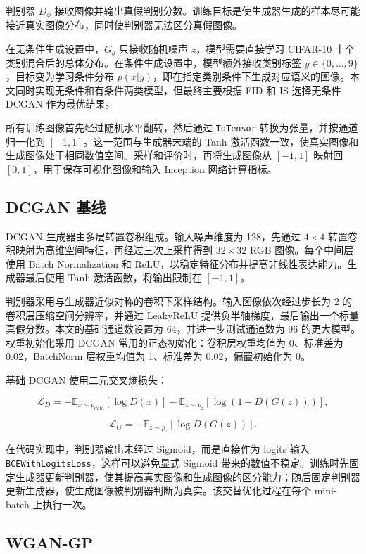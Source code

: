\documentclass[UTF8,a4paper,12pt]{ctexart}
\begin{document}
判别器 $D_\phi$ 接收图像并输出真假判别分数。训练目标是使生成器生成的样本尽可能接近真实图像分布，同时使判别器无法区分真假图像。


在无条件生成设置中，$G_\theta$ 只接收随机噪声 $z$，模型需要直接学习 CIFAR-10 十个类别混合后的总体分布。在条件生成设置中，模型额外接收类别标签 $y \in \{0,\dots,9\}$，目标变为学习条件分布 $p(x|y)$，即在指定类别条件下生成对应语义的图像。本文同时实现无条件和有条件两类模型，但最终主要根据 FID 和 IS 选择无条件 DCGAN 作为最优结果。


所有训练图像首先经过随机水平翻转，然后通过 \texttt{ToTensor} 转换为张量，并按通道归一化到 $[-1,1]$。这一范围与生成器末端的 Tanh 激活函数一致，使真实图像和生成图像处于相同数值空间。采样和评价时，再将生成图像从 $[-1,1]$ 映射回 $[0,1]$，用于保存可视化图像和输入 Inception 网络计算指标。


\subsection{DCGAN 基线}

DCGAN 生成器由多层转置卷积组成。输入噪声维度为 128，先通过 $4\times4$ 转置卷积映射为高维空间特征，再经过三次上采样得到 $32\times32$ RGB 图像。每个中间层使用 Batch Normalization 和 ReLU，以稳定特征分布并提高非线性表达能力。生成器最后使用 Tanh 激活函数，将输出限制在 $[-1, 1]$。


判别器采用与生成器近似对称的卷积下采样结构。输入图像依次经过步长为 2 的卷积层压缩空间分辨率，并通过 LeakyReLU 提供负半轴梯度，最后输出一个标量真假分数。本文的基础通道数设置为 64，并进一步测试通道数为 96 的更大模型。权重初始化采用 DCGAN 常用的正态初始化：卷积层权重均值为 0、标准差为 0.02，BatchNorm 层权重均值为 1、标准差为 0.02，偏置初始化为 0。


基础 DCGAN 使用二元交叉熵损失：


$$
\mathcal{L}_D =
-\mathbb{E}_{x \sim p_{data}}[\log D(x)]
-\mathbb{E}_{z \sim p_z}[\log(1-D(G(z)))],
$$


$$
\mathcal{L}_G =
-\mathbb{E}_{z \sim p_z}[\log D(G(z))].
$$


在代码实现中，判别器输出未经过 Sigmoid，而是直接作为 logits 输入 \texttt{BCEWithLogitsLoss}，这样可以避免显式 Sigmoid 带来的数值不稳定。训练时先固定生成器更新判别器，使其提高真实图像和生成图像的区分能力；随后固定判别器更新生成器，使生成图像被判别器判断为真实。该交替优化过程在每个 mini-batch 上执行一次。


\subsection{WGAN-GP}
\end{document}
